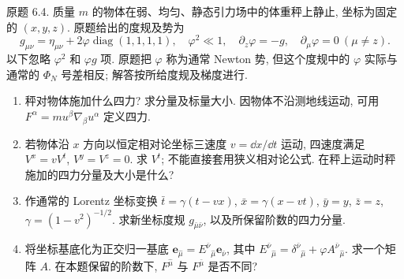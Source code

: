\begin{exercise}
原题 6.4. 质量 $m$ 的物体在弱、均匀、静态引力场中的体重秤上静止, 坐标为固定的 $(x,y,z)$. 原题给出的度规及势为
\[
g_{\mu\nu}=\eta_{\mu\nu}+2\varphi\operatorname{diag}(1,1,1,1),\quad
\varphi^2\ll1,\quad \partial_z\varphi=-g,\quad \partial_\mu\varphi=0\ (\mu\ne z).
\]
以下忽略 $\varphi^2$ 和 $\varphi g$ 项. 原题把 $\varphi$ 称为通常 Newton 势, 但这个度规中的 $\varphi$ 实际与通常的 $\Phi_N$ 号差相反; 解答按所给度规及梯度进行.
\begin{enumerate}[label=(\alph*)]
\item 秤对物体施加什么四力? 求分量及标量大小. 因物体不沿测地线运动, 可用 $F^\alpha=mu^\beta\nabla_\beta u^\alpha$ 定义四力.
\item 若物体沿 $x$ 方向以恒定相对论坐标三速度 $v=\dd x/\dd t$ 运动, 四速度满足 $V^x=vV^t$, $V^y=V^z=0$. 求 $V^t$; 不能直接套用狭义相对论公式. 在秤上运动时秤施加的四力分量及大小是什么?
\item 作通常的 Lorentz 坐标变换 $\bar t=\gamma(t-vx)$, $\bar x=\gamma(x-vt)$, $\bar y=y$, $\bar z=z$, $\gamma=(1-v^2)^{-1/2}$. 求新坐标度规 $g_{\bar\mu\bar\nu}$, 以及所保留阶数的四力分量.
\item 将坐标基底化为正交归一基底 $\boldsymbol e_{\hat\mu}=E^{\bar\nu}{}_{\hat\mu}\boldsymbol e_{\bar\nu}$, 其中 $E^{\bar\nu}{}_{\hat\mu}=\delta^{\bar\nu}{}_{\hat\mu}+\varphi A^{\bar\nu}{}_{\hat\mu}$. 求一个矩阵 $A$. 在本题保留的阶数下, $F^{\hat\mu}$ 与 $F^{\bar\mu}$ 是否不同?
\end{enumerate}
\end{exercise}
